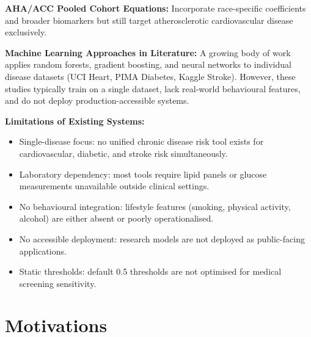 \documentclass[12pt,a4paper]{report}
\begin{document}
\textbf{AHA/ACC Pooled Cohort Equations:} Incorporate race-specific coefficients and broader biomarkers but still target atherosclerotic cardiovascular disease exclusively.

\textbf{Machine Learning Approaches in Literature:} A growing body of work applies random forests, gradient boosting, and neural networks to individual disease datasets (UCI Heart, PIMA Diabetes, Kaggle Stroke). However, these studies typically train on a single dataset, lack real-world behavioural features, and do not deploy production-accessible systems.

\textbf{Limitations of Existing Systems:}
\begin{itemize}[leftmargin=*]
  \item Single-disease focus: no unified chronic disease risk tool exists for cardiovascular, diabetic, and stroke risk simultaneously.
  \item Laboratory dependency: most tools require lipid panels or glucose measurements unavailable outside clinical settings.
  \item No behavioural integration: lifestyle features (smoking, physical activity, alcohol) are either absent or poorly operationalised.
  \item No accessible deployment: research models are not deployed as public-facing applications.
  \item Static thresholds: default 0.5 thresholds are not optimised for medical screening sensitivity.
\end{itemize}

\section{Motivations}
\end{document}
